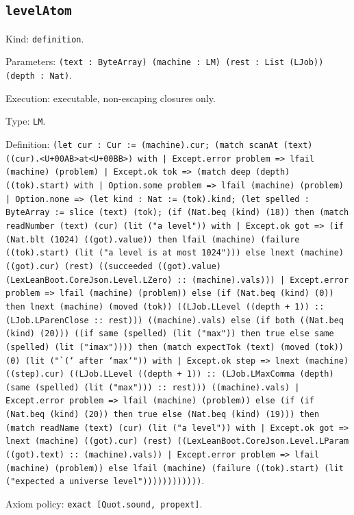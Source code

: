 \documentclass[11pt]{article}
\begin{document}
\subsection*{\texttt{levelAtom}}
\noindent Kind: \texttt{definition}.\par
\noindent Parameters: \texttt{(text : ByteArray) (machine : LM) (rest : List (LJob)) (depth : Nat)}.\par
\noindent Execution: executable, non-escaping closures only.\par
\noindent Type: \texttt{LM}.\par
\noindent Definition: \texttt{(let cur : Cur := (machine).cur; (match scanAt (text) ((cur).<U+00AB>at<U+00BB>) with | Except.error problem => lfail (machine) (problem) | Except.ok tok => (match deep (depth) ((tok).start) with | Option.some problem => lfail (machine) (problem) | Option.none => (let kind : Nat := (tok).kind; (let spelled : ByteArray := slice (text) (tok); (if (Nat.beq (kind) (18)) then (match readNumber (text) (cur) (lit ("a level")) with | Except.ok got => (if (Nat.blt (1024) ((got).value)) then lfail (machine) (failure ((tok).start) (lit ("a level is at most 1024"))) else lnext (machine) ((got).cur) (rest) ((succeeded ((got).value) (LexLeanBoot.CoreJson.Level.LZero) :: (machine).vals))) | Except.error problem => lfail (machine) (problem)) else (if (Nat.beq (kind) (0)) then lnext (machine) (moved (tok)) ((LJob.LLevel ((depth + 1)) :: (LJob.LParenClose :: rest))) ((machine).vals) else (if both ((Nat.beq (kind) (20))) ((if same (spelled) (lit ("max")) then true else same (spelled) (lit ("imax")))) then (match expectTok (text) (moved (tok)) (0) (lit ("`(` after `max`")) with | Except.ok step => lnext (machine) ((step).cur) ((LJob.LLevel ((depth + 1)) :: (LJob.LMaxComma (depth) (same (spelled) (lit ("max"))) :: rest))) ((machine).vals) | Except.error problem => lfail (machine) (problem)) else (if (if (Nat.beq (kind) (20)) then true else (Nat.beq (kind) (19))) then (match readName (text) (cur) (lit ("a level")) with | Except.ok got => lnext (machine) ((got).cur) (rest) ((LexLeanBoot.CoreJson.Level.LParam ((got).text) :: (machine).vals)) | Except.error problem => lfail (machine) (problem)) else lfail (machine) (failure ((tok).start) (lit ("expected a universe level"))))))))))))}.\par
\noindent Axiom policy: \texttt{exact [Quot.sound, propext]}.\par
\end{document}
